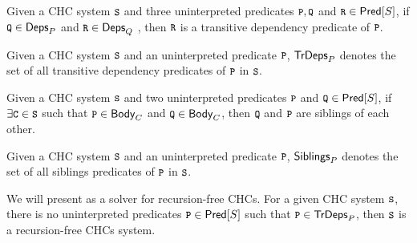 \begin{defn}
  Given a CHC system $\cc{S}$ and three uninterpreted predicates $\cc{P},
  \cc{Q}$ and $\cc{R} \in \predof{S}$, if $\cc{Q} \in \depsof{P}$ and $\cc{R} \in \depsof {Q}$
  , then $\cc{R}$ is a transitive dependency predicate of $\cc{P}$.
\end{defn}
%
Given a CHC system $\cc{S}$ and an uninterpreted predicate $\cc{P}$, $\mathsf{TrDeps}_{P}$
denotes the set of all transitive dependency predicates of $\cc{P}$ in $\cc{S}$.
%

\begin{defn}
  Given a CHC system $\cc{S}$ and two uninterpreted predicates $\cc{P}$ and
  $\cc{Q} \in \predof{S}$, if $\exists \cc{C} \in \cc{S}$ such that $\cc{P} \in \bodyof{C}$
  and $\cc{Q} \in \bodyof{C}$, then $\cc{Q}$ and $\cc{P}$ are siblings of each other.
\end{defn}
%
Given a CHC system $\cc{S}$ and an uninterpreted predicate $\cc{P}$, $\mathsf{Siblings}_{P}$
denotes the set of all siblings predicates of $\cc{P}$ in $\cc{S}$.
%



We will present \sys as a solver for recursion-free CHCs.
%
For a given CHC system $\cc{S}$, there is no uninterpreted predicates $\cc{P} \in \predof{S}$ 
such that $\cc{P} \in \tdepsof{P}$, then $\cc{S}$ is a recursion-free CHCs system.

